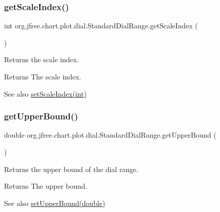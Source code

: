 \subsubsection{\texorpdfstring{get\+Scale\+Index()}{getScaleIndex()}}
{\footnotesize\ttfamily int org.\+jfree.\+chart.\+plot.\+dial.\+Standard\+Dial\+Range.\+get\+Scale\+Index (\begin{DoxyParamCaption}{ }\end{DoxyParamCaption})}

Returns the scale index.

\begin{DoxyReturn}{Returns}
The scale index.
\end{DoxyReturn}
\begin{DoxySeeAlso}{See also}
\mbox{\hyperlink{classorg_1_1jfree_1_1chart_1_1plot_1_1dial_1_1_standard_dial_range_a9ca6b99ad0d461c6dd6ae21cbeae2c9d}{set\+Scale\+Index(int)}} 
\end{DoxySeeAlso}
\mbox{\label{classorg_1_1jfree_1_1chart_1_1plot_1_1dial_1_1_standard_dial_range_a2bd7326ba0d20c64028fd552e90cc27c}} 
\subsubsection{\texorpdfstring{get\+Upper\+Bound()}{getUpperBound()}}
{\footnotesize\ttfamily double org.\+jfree.\+chart.\+plot.\+dial.\+Standard\+Dial\+Range.\+get\+Upper\+Bound (\begin{DoxyParamCaption}{ }\end{DoxyParamCaption})}

Returns the upper bound of the dial range.

\begin{DoxyReturn}{Returns}
The upper bound.
\end{DoxyReturn}
\begin{DoxySeeAlso}{See also}
\mbox{\hyperlink{classorg_1_1jfree_1_1chart_1_1plot_1_1dial_1_1_standard_dial_range_a23793be046d52769685411c84117b287}{set\+Upper\+Bound(double)}} 
\end{DoxySeeAlso}
\mbox{\label{classorg_1_1jfree_1_1chart_1_1plot_1_1dial_1_1_standard_dial_range_ac31065601d811822c607867920ca037c}} 
